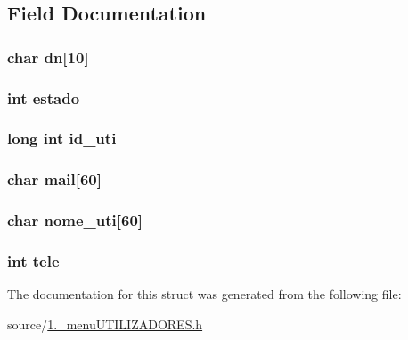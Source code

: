 \subsection{Field Documentation}
\hypertarget{structutilizador_aaee503890dbae4a98b7f7be5fd927cb0}{
\subsubsection[{dn}]{\setlength{\rightskip}{0pt plus 5cm}char dn\mbox{[}10\mbox{]}}}\label{structutilizador_aaee503890dbae4a98b7f7be5fd927cb0}
\hypertarget{structutilizador_a876d08c1d21086e4fd228744da10d028}{
\subsubsection[{estado}]{\setlength{\rightskip}{0pt plus 5cm}int estado}}\label{structutilizador_a876d08c1d21086e4fd228744da10d028}
\hypertarget{structutilizador_ade1e35363a9e73ac0443d514809a2ed2}{
\subsubsection[{id\+\_\+uti}]{\setlength{\rightskip}{0pt plus 5cm}long int id\+\_\+uti}}\label{structutilizador_ade1e35363a9e73ac0443d514809a2ed2}
\hypertarget{structutilizador_a02cac4787c82da8aa24aa640d9f9f4e8}{
\subsubsection[{mail}]{\setlength{\rightskip}{0pt plus 5cm}char mail\mbox{[}60\mbox{]}}}\label{structutilizador_a02cac4787c82da8aa24aa640d9f9f4e8}
\hypertarget{structutilizador_a9073385a3e289a31c348400685f9ec30}{
\subsubsection[{nome\+\_\+uti}]{\setlength{\rightskip}{0pt plus 5cm}char nome\+\_\+uti\mbox{[}60\mbox{]}}}\label{structutilizador_a9073385a3e289a31c348400685f9ec30}
\hypertarget{structutilizador_ac061470c693046faeb6b26265dff592f}{
\subsubsection[{tele}]{\setlength{\rightskip}{0pt plus 5cm}int tele}}\label{structutilizador_ac061470c693046faeb6b26265dff592f}


The documentation for this struct was generated from the following file\+:\begin{DoxyCompactItemize}
\item 
source/\hyperlink{1_81__menu_u_t_i_l_i_z_a_d_o_r_e_s_8h}{1.\+\_\+menu\+U\+T\+I\+L\+I\+Z\+A\+D\+O\+R\+E\+S.\+h}\end{DoxyCompactItemize}
